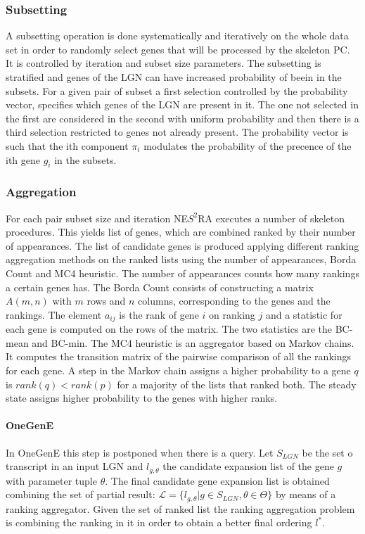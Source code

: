 		

		\subsubsection{Subsetting}
		A subsetting operation is done systematically and iteratively on the whole data set in order to randomly select genes that will be processed by the skeleton PC.
		It is controlled by iteration and subset size parameters.
		The subsetting is stratified and genes of the LGN can have increased probability of beein in the subsets.
		For a given pair of subset a first selection controlled by the probability vector, specifies which genes of the LGN are present in it.
		The one not selected in the first are considered in the second with uniform probability and then there is a third selection restricted to genes not already present.
		The probability vector is such that the ith component $\pi_i$ modulates the probability of the precence of the ith gene $g_i$ in the subsets.

		\subsubsection{Aggregation}
		For each pair subset size and iteration NE$S^2$RA executes a number of skeleton procedures.
		This yields list of genes, which are combined ranked by their number of appearances.
		The list of candidate genes is produced applying different ranking aggregation methods on the ranked lists using the number of appearances, Borda Count and MC4 heuristic.
		The number of appearances counts how many rankings a certain genes has.
		The Borda Count consists of constructing a matrix $A(m,n)$ with $m$ rows and $n$ columns, corresponding to the genes and the rankings.
		The element $a_{ij}$ is the rank of gene $i$ on ranking $j$ and a statistic for each gene is computed on the rows of the matrix.
		The two statistics are the BC-mean and BC-min.
		The MC4 heuristic is an aggregator based on Markov chains.
		It computes the transition matrix of the pairwise comparison of all the rankings for each gene.
		A step in the Markov chain assigns a higher probability to a gene $q$ is $rank(q)< rank(p)$ for a majority of the lists that ranked both.
		The steady state assigns higher probability to the genes with higher ranks.

			\paragraph{OneGenE}
			In OneGenE this step is postponed when there is a query.
			Let $S_{LGN}$ be the set o transcript in an input LGN and $l_{g, \theta}$ the candidate expansion list of the gene $g$ with parameter tuple $\theta$.
			The final candidate gene expansion list is obtained combining the set of partial result: $\mathcal{L} = \{l_{g, \theta} | g\in S_{LGN}, \theta\in \Theta\}$ by means of a ranking aggregator.
			Given the set of ranked list the ranking aggregation problem is combining the ranking in it in order to obtain a better final ordering $l^*$.

